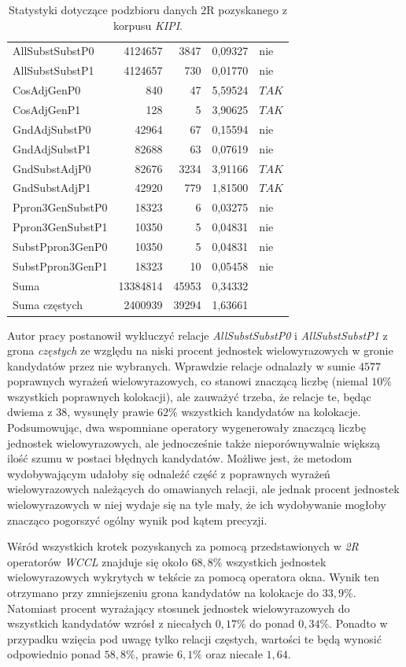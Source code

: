 \documentclass[11pt,a4paper]{llncs}
\begin{document}
\begin{table}[h!]
\begin{tabular}{ l | r | r | r | l }
	AllSubstSubstP0	&	4124657	&	3847	&	0,09327	&	nie	\\
	AllSubstSubstP1	&	4124657	&	730	&	0,01770	&	nie	\\
	CosAdjGenP0	&	840	&	47	&	5,59524	&	$ TAK $	\\
	CosAdjGenP1	&	128	&	5	&	3,90625	&	$ TAK $	\\
	GndAdjSubstP0	&	42964	&	67	&	0,15594	&	nie	\\
	GndAdjSubstP1	&	82688	&	63	&	0,07619	&	nie	\\
	GndSubstAdjP0	&	82676	&	3234	&	3,91166	&	$ TAK $	\\
	GndSubstAdjP1	&	42920	&	779	&	1,81500	&	$ TAK $	\\
	Ppron3GenSubstP0	&	18323	&	6	&	0,03275	&	nie	\\
	Ppron3GenSubstP1	&	10350	&	5	&	0,04831	&	nie	\\
	SubstPpron3GenP0	&	10350	&	5	&	0,04831	&	nie	\\
	SubstPpron3GenP1	&	18323	&	10	&	0,05458	&	nie	\\
	\midrule									
	Suma	&	13384814	&	45953	&	0,34332	&		\\
	Suma częstych	&	2400939	&	39294	&	1,63661	&		\\
	\bottomrule
\end{tabular}
\caption[Statystyki podzbioru danych \emph{KIPI} 2R]{Statystyki dotyczące podzbioru danych 2R pozyskanego z korpusu \emph{KIPI}.}
\label{KIPI_2R_stats}
\end{table}

Autor pracy postanowił wykluczyć relacje \emph{AllSubstSubstP0} i \emph{AllSubstSubstP1} z grona \emph{częstych} ze względu na niski procent jednostek wielowyrazowych w gronie kandydatów przez nie wybranych.
Wprawdzie relacje odnalazły w sumie $ 4577 $ poprawnych wyrażeń wielowyrazowych, co stanowi znaczącą liczbę (niemal $ 10 \% $ wszystkich poprawnych kolokacji), ale zauważyć trzeba, że relacje te, będąc dwiema z 38, wysunęły prawie $ 62\% $ wszystkich kandydatów na kolokacje.
Podsumowując, dwa wspomniane operatory wygenerowały znaczącą liczbę jednostek wielowyrazowych, ale jednocześnie także nieporównywalnie większą ilość szumu w postaci błędnych kandydatów.
Możliwe jest, że metodom wydobywającym udałoby się odnaleźć część z poprawnych wyrażeń wielowyrazowych należących do omawianych relacji, ale jednak procent jednostek wielowyrazowych w niej wydaje się na tyle mały, że ich wydobywanie mogłoby znacząco pogorszyć ogólny wynik pod kątem precyzji.

\par
Wśród wszystkich krotek pozyskanych za pomocą przedstawionych w \emph{2R} operatorów \emph{WCCL} znajduje się około $ 68,8\% $ wszystkich jednostek wielowyrazowych wykrytych w tekście za pomocą operatora okna.
Wynik ten otrzymano przy zmniejszeniu grona kandydatów na kolokacje do $ 33,9\% $.
Natomiast procent wyrażający stosunek jednostek wielowyrazowych do wszystkich kandydatów wzrósł z niecałych $ 0,17\% $ do ponad $ 0,34\% $.
Ponadto w przypadku wzięcia pod uwagę tylko relacji częstych, wartości te będą wynosić odpowiednio ponad $ 58,8\% $, prawie $ 6,1\% $ oraz niecałe $ 1,64 $.
\end{document}
